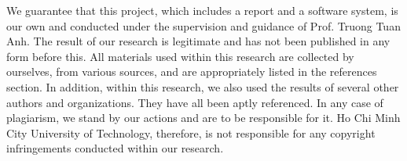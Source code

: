 We guarantee that this project, which includes a report and a software system, is our own and conducted under the supervision and guidance of Prof. Truong Tuan Anh. The result of our research is legitimate and has not been published in any form before this. All materials used within this research are collected by ourselves, from various sources, and are appropriately listed in the references section. In addition, within this research, we also used the results of several other authors and organizations. They have all been aptly referenced. In any case of plagiarism, we stand by our actions and are to be responsible for it. Ho Chi Minh City University of Technology, therefore, is not responsible for any copyright infringements conducted within our research.